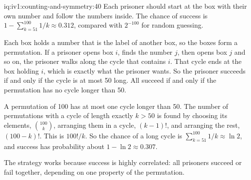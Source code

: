 \begin{solution}{iq:iv1:counting-and-symmetry:40}
Each prisoner should start at the box with their own number and follow the numbers inside. The chance of success is $1 - \sum_{k=51}^{100} 1/k \approx 0.312$, compared with $2^{-100}$ for random guessing.

Each box holds a number that is the label of another box, so the boxes form a permutation. If a prisoner opens box $i$, finds the number $j$, then opens box $j$ and so on, the prisoner walks along the cycle that contains $i$. That cycle ends at the box holding $i$, which is exactly what the prisoner wants. So the prisoner succeeds if and only if the cycle is at most 50 long. All succeed if and only if the permutation has no cycle longer than 50.

A permutation of 100 has at most one cycle longer than 50. The number of permutations with a cycle of length exactly $k > 50$ is found by choosing its elements, $\binom{100}{k}$, arranging them in a cycle, $(k - 1)!$, and arranging the rest, $(100 - k)!$. This is $100!/k$. So the chance of a long cycle is $\sum_{k=51}^{100} 1/k \approx \ln 2$, and success has probability about $1 - \ln 2 \approx 0.307$.

The strategy works because success is highly correlated: all prisoners succeed or fail together, depending on one property of the permutation.

\end{solution}
